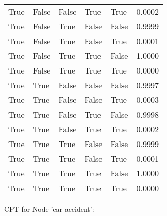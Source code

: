 \begin{tabular}{lllllr}
         True &         False &        False &         True &     True & 0.0002 \\
         True &         False &         True &        False &    False & 0.9999 \\
         True &         False &         True &        False &     True & 0.0001 \\
         True &         False &         True &         True &    False & 1.0000 \\
         True &         False &         True &         True &     True & 0.0000 \\
         True &          True &        False &        False &    False & 0.9997 \\
         True &          True &        False &        False &     True & 0.0003 \\
         True &          True &        False &         True &    False & 0.9998 \\
         True &          True &        False &         True &     True & 0.0002 \\
         True &          True &         True &        False &    False & 0.9999 \\
         True &          True &         True &        False &     True & 0.0001 \\
         True &          True &         True &         True &    False & 1.0000 \\
         True &          True &         True &         True &     True & 0.0000 \\
\bottomrule
\end{tabular}


CPT for Node 'car-accident':

